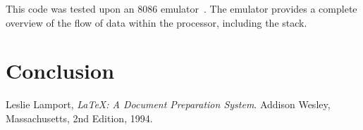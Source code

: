 \documentclass[12pt,a4paper]{article}
\begin{document}
This code was tested upon an 8086 emulator~\cite{emu8086}.
The emulator provides a complete overview of the flow of data within the processor, including the stack. 




\section{Conclusion}






\renewcommand{\refname}{Bibliography}
\begin{thebibliography}{9}

  Leslie Lamport,
  \emph{\LaTeX: A Document Preparation System}.
  Addison Wesley, Massachusetts,
  2nd Edition,
  1994.

\end{thebibliography}
\end{document}

